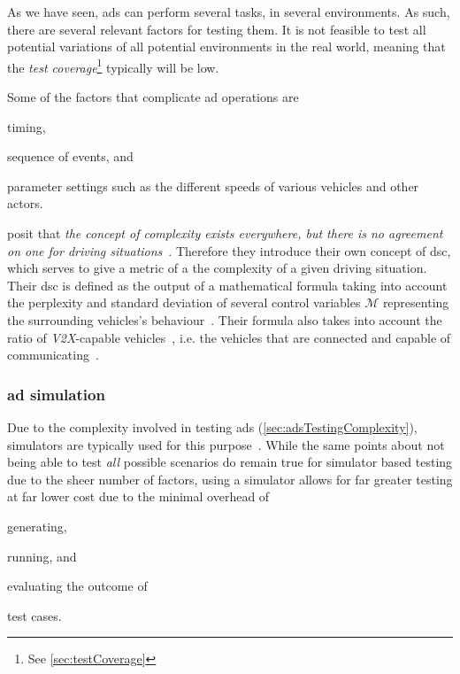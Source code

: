 As we have seen, \acrshort{ads} can perform several tasks, in several environments. As such, there
are several relevant factors for testing them. It is not feasible to test all potential variations
of all potential environments in the real world, meaning that the \textit{test
    coverage}\footnote{See \cref{sec:testCoverage}} typically will be low.

Some of the factors that complicate \acrshort{ad} operations are \begin{inparaenum}
    \item timing,
    \item sequence of events, and
    \item parameter settings such as the different speeds of various vehicles and other actors.
\end{inparaenum}

\citeauthor{adsComplexityIndex18} posit that \textit{the concept of complexity exists everywhere,
    but there is no agreement on one for driving situations}~\cite[1182]{adsComplexityIndex18}.
Therefore they introduce their own concept of \acrfull{dsc}, which serves to give a metric of a
the complexity of a given driving situation. Their \acrshort{dsc} is defined as the output of a
mathematical formula taking into account the perplexity and standard deviation of several
control variables $\mathcal{M}$ representing the surrounding vehicles's
behaviour~\cite[1182]{adsComplexityIndex18}. Their formula also takes into account the ratio of
\textit{V2X}-capable vehicles~\cite[1182]{adsComplexityIndex18}, i.e. the vehicles that are
connected and capable of communicating~\cite[1]{v2xTestingSurvey2019}.


\subsubsection{\acrlong{ad} simulation}

Due to the complexity involved in testing \acrlong{ads} (\cref{sec:adsTestingComplexity}),
simulators are typically used for this purpose~\cite{DeepScenario}. While the same points about not
being able to test \textit{all} possible scenarios do remain true for simulator based testing due to
the sheer number of factors, using a simulator allows for far greater testing at far lower cost due
to the minimal overhead of
\begin{inparaenum}
    \item generating,
    \item running, and
    \item evaluating the outcome of
\end{inparaenum}
test cases.

